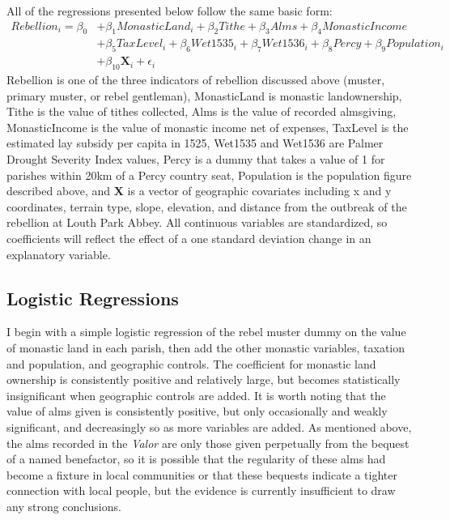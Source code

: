 \documentclass[12pt]{article}
\begin{document}
All of the regressions presented below follow the same basic form:
\begin{equation}
    \begin{aligned}
Rebellion_{i} = \beta_{0} & + \beta_{1}MonasticLand_{i} + \beta_{2}Tithe + \beta_{3}Alms + \beta_{4}MonasticIncome  \\ 
& + \beta_{5}TaxLevel_{i} + \beta_{6}Wet1535_{i} +\beta_{7}Wet1536_{i} + \beta_{8}Percy + \beta_{9}Population_{i} \\
& + \beta_{10}\textbf{X}_{i} + \epsilon_i
    \end{aligned}
\end{equation}
Rebellion is one of the three indicators of rebellion discussed above (muster, primary muster, or rebel gentleman), MonasticLand is monastic landownership, Tithe is the value of tithes collected, Alms is the value of recorded almsgiving, MonasticIncome is the value of monastic income net of expenses, TaxLevel is the estimated lay subsidy per capita in 1525, Wet1535 and Wet1536 are Palmer Drought Severity Index values, Percy is a dummy that takes a value of 1 for parishes within 20km of a Percy country seat, Population is the population figure described above, and \textbf{X} is a vector of geographic covariates including x and y coordinates, terrain type, slope, elevation, and distance from the outbreak of the rebellion at Louth Park Abbey. All continuous variables are standardized, so coefficients will reflect the effect of a one standard deviation change in an explanatory variable.

\subsection{Logistic Regressions}

I begin with a simple logistic regression of the rebel muster dummy on the value of monastic land in each parish, then add the other monastic variables, taxation and population, and geographic controls. The coefficient for monastic land ownership is consistently positive and relatively large, but becomes statistically insignificant when geographic controls are added. It is worth noting that the value of alms given is consistently positive, but only occasionally and weakly significant, and decreasingly so as more variables are added. As mentioned above, the alms recorded in the \emph{Valor} are only those given perpetually from the bequest of a named benefactor, so it is possible that the regularity of these alms had become a fixture in local communities or that these bequests indicate a tighter connection with local people, but the evidence is currently insufficient to draw any strong conclusions.
\end{document}
